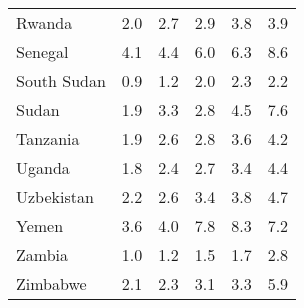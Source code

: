 \begin{table}[b]
\begin{tabular}[t]{lrrrrr}
Rwanda & 2.0 & 2.7 & 2.9 & 3.8 & 3.9\\
Senegal & 4.1 & 4.4 & 6.0 & 6.3 & 8.6\\
South Sudan & 0.9 & 1.2 & 2.0 & 2.3 & 2.2\\
Sudan & 1.9 & 3.3 & 2.8 & 4.5 & 7.6\\
Tanzania & 1.9 & 2.6 & 2.8 & 3.6 & 4.2\\
Uganda & 1.8 & 2.4 & 2.7 & 3.4 & 4.4\\
Uzbekistan & 2.2 & 2.6 & 3.4 & 3.8 & 4.7\\
Yemen & 3.6 & 4.0 & 7.8 & 8.3 & 7.2\\
Zambia & 1.0 & 1.2 & 1.5 & 1.7 & 2.8\\
Zimbabwe & 2.1 & 2.3 & 3.1 & 3.3 & 5.9\\
\bottomrule
\end{tabular}
\end{table}